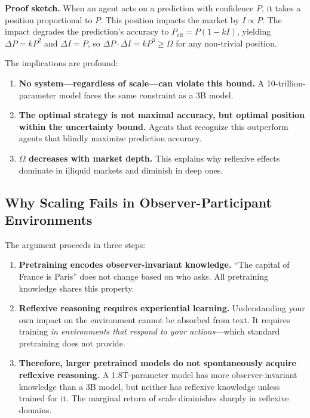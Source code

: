 \documentclass[11pt,a4paper]{article}
\begin{document}
\textbf{Proof sketch.} When an agent acts on a prediction with confidence $P$, it takes a position proportional to $P$. This position impacts the market by $I \propto P$. The impact degrades the prediction's accuracy to $P_{\text{eff}} = P(1-kI)$, yielding $\Delta P = kP^2$ and $\Delta I = P$, so $\Delta P \cdot \Delta I = kP^3 \geq \Omega$ for any non-trivial position.

The implications are profound:
\begin{enumerate}[leftmargin=*]
\item \textbf{No system---regardless of scale---can violate this bound.} A 10-trillion-parameter model faces the same constraint as a 3B model.
\item \textbf{The optimal strategy is not maximal accuracy, but optimal position within the uncertainty bound.} Agents that recognize this outperform agents that blindly maximize prediction accuracy.
\item \textbf{$\Omega$ decreases with market depth.} This explains why reflexive effects dominate in illiquid markets and diminish in deep ones.
\end{enumerate}

\subsection{Why Scaling Fails in Observer-Participant Environments}

The argument proceeds in three steps:

\begin{enumerate}[leftmargin=*]
\item \textbf{Pretraining encodes observer-invariant knowledge.} ``The capital of France is Paris'' does not change based on who asks. All pretraining knowledge shares this property.
\item \textbf{Reflexive reasoning requires experiential learning.} Understanding your own impact on the environment cannot be absorbed from text. It requires training \textit{in environments that respond to your actions}---which standard pretraining does not provide.
\item \textbf{Therefore, larger pretrained models do not spontaneously acquire reflexive reasoning.} A 1.8T-parameter model has more observer-invariant knowledge than a 3B model, but neither has reflexive knowledge unless trained for it. The marginal return of scale diminishes sharply in reflexive domains.
\end{enumerate}
\end{document}
